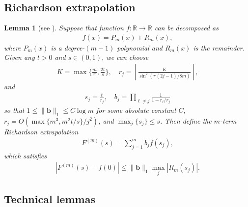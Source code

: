 \documentclass[aps,pra,reprint,groupedaddress,floatfix]{revtex4-2}
\newtheorem{lemma}{Lemma}
\newcommand{\mb}{\mathbb}
\newcommand{\sz}[1]{{\color{blue} Shuo: #1}}
\begin{document}
\subsection{Richardson extrapolation}\label{append:Richardson}
\begin{lemma}[{see \cite[Lemma A.9]{wang2025randomized}}]
\label{lem:richardson-extrapolation}
    Suppose that function $f\colon \mb R \to \mathbb{R}$ can be decomposed as 
    \begin{align*}
        f(x) = P_m(x)+R_m(x),
    \end{align*} 
    where $P_m(x)$ is a degree-$(m-1)$ polynomial and $R_m(x)$ is the remainder. Given any $t > 0$ and $s\in (0,1)$, we can choose 
    \begin{align*}
        K = \max\Big\{\frac{m}{\pi}, \frac{2t}{s}\Big\}, \quad r_j =\left\lceil \frac{K}{\sin^2(\pi(2j-1)/8m)}\right\rceil,
    \end{align*}
    and
    \begin{align*}
        s_j = \frac{t}{r_j}, \quad b_j=\prod_{\ell \neq j} \frac{1}{1-r_\ell/r_j}
    \end{align*}
    so that $1\le \|\mathbf{b}\|_1 \le C\log m$ for some absolute constant $C$, $r_j=O(\max\{m^3, m^2t/s\}/j^2)$, and $\max_{j}\{ s_j \}\le s$. Then define the $m$-term Richardson extrapolation \begin{align}
        \label{eq_richardson extrapolation}
        F^{(m)}(s)=\sum_{j=1}^m b_j f(s_j),
    \end{align}
    which satisfies \begin{align}
    \label{eq:error-F}
        |F^{(m)}(s)-f(0)|\le \|\mathbf{b}\|_1 \max_j|R_{m}(s_j)|.
    \end{align}
\end{lemma}

\subsection{Technical lemmas}
\end{document}
